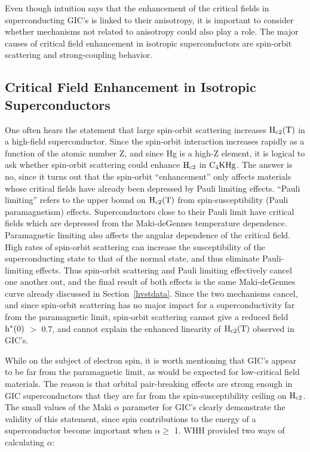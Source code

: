         Even though  intuition says that  the enhancement of  the  critical
fields   in superconducting GIC's  is   linked to their  anisotropy, it  is
important  to consider whether mechanisms not  related  to anisotropy could
also  play   a role.   The major causes  of  critical field enhancement  in
isotropic   superconductors are spin-orbit   scattering and strong-coupling
behavior.

\subsection{Critical Field Enhancement in Isotropic Superconductors}
\label{spin-orbit}

        One  often hears  the  statement that large  spin-orbit  scattering
increases $\rm   H_{c2}(T)$  in a   high-field superconductor.   Since  the
spin-orbit interaction   increases  rapidly  as  a  function of  the atomic
number\cite{merzbacher70} Z,  and since   Hg is a   high-Z element,  it  is
logical to ask whether spin-orbit scattering could enhance  $\rm H_{c2}$ in
$\rm C_4KHg$.  The  answer is  no, since  it  turns out that the spin-orbit
``enhancement'' only affects  materials whose critical  fields have already
been depressed    by   Pauli  limiting effects.\cite{werthamer66,orlando79}
``Pauli  limiting''  refers to the   upper   bound on $\rm  H_{c2}(T)$ from
spin-susceptibility                   (Pauli                 paramagnetism)
effects.\cite{clogston62,chandrasekhar62}   Superconductors  close to their
Pauli limit have critical fields which are depressed from the Maki-deGennes
temperature dependence.  Paramagnetic  limiting  also affects  the  angular
dependence  of the    critical field.\cite{aoi73,decroux82}  High  rates of
spin-orbit scattering   can   increase   the    susceptibility  of      the
superconducting  state to that  of  the normal state,   and  thus eliminate
Pauli-limiting effects.   Thus  spin-orbit  scattering  and  Pauli limiting
effectively cancel one another out, and the final result of both effects is
the     same       Maki-deGennes     curve        already   discussed    in
Section~\ref{hvstdata}.\cite{orlando79}   Since  the two mechanisms cancel,
and since spin-orbit scattering has no major impact for a superconductivity
far   from the   paramagnetic limit,  spin-orbit  scattering  cannot give a
reduced field  $\rm   h^*(0)$ $>$  0.7,  and cannot   explain  the enhanced
linearity of $\rm H_{c2}(T)$ observed in GIC's.

        While on the subject of electron spin, it is  worth mentioning that
GIC's appear to be far from the paramagnetic limit, as would be expected
for low-critical field materials.  The reason is that orbital
pair-breaking effects are  strong enough in  GIC superconductors that they
are far  from the spin-susceptibility  ceiling on $\rm H_{c2}$.   The small
values  of the  Maki   $\alpha$  parameter\cite{maki64}   for GIC's clearly
demonstrate the validity  of this  statement, since spin contributions  to the
energy   of  a superconductor   become   important   when $\alpha  \geq$  1.
WHH\cite{werthamer66} provided two ways of calculating $\alpha$:

